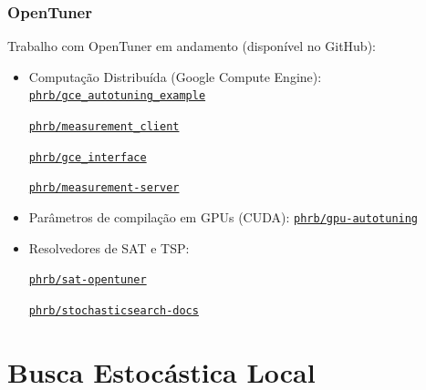 \documentclass[10pt, compress]{beamer}
\begin{document}
\begin{frame}[fragile]
    \frametitle{OpenTuner}
    Trabalho com OpenTuner em andamento (disponível no \alert{GitHub}):
    \begin{itemize}
        \item Computação Distribuída (\alert{Google Compute Engine}):
            \href{https://github.com/phrb/gce\_autotuning\_example}{\tt phrb/gce\_autotuning\_example}

            \href{https://github.com/phrb/measurement\_client}{\tt phrb/measurement\_client}

            \href{https://github.com/phrb/gce\_interface}{\tt phrb/gce\_interface}

            \href{https://github.com/phrb/measurement-server}{\tt phrb/measurement-server}
            \pause
        \item Parâmetros de compilação em GPUs (\alert{CUDA}):
            \href{https://github.com/phrb/gpu-autotuning}{\tt phrb/gpu-autotuning}
            \pause
        \item Resolvedores de \alert{SAT} e \alert{TSP}:

            \href{https://github.com/phrb/sat-opentuner}{\tt phrb/sat-opentuner}

            \href{https://github.com/phrb/stochasticsearch-docs}{\tt phrb/stochasticsearch-docs}
    \end{itemize}
\end{frame}

\section{Busca Estocástica Local}
\end{document}
